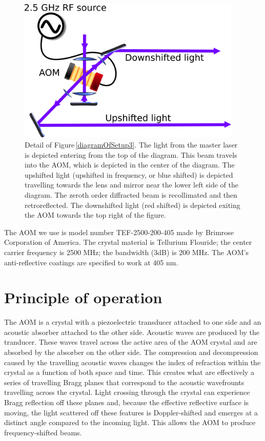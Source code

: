 \begin{figure}
\centerline{
\includegraphics[width=0.95\textwidth]{diagramOfAOM}}
\caption[AOM diagram]{\label{aomDiagramDetail} Detail of Figure\,\ref{diagramOfSetup3}. The light from the master laser is depicted entering from the top of the diagram. This beam travels into the AOM, which is depicted in the center of the diagram. The upshifted light (upshifted in frequency, or blue shifted) is depicted travelling towards the lens and mirror near the lower left side of the diagram. The zeroth order diffracted beam is recollimated and then retroreflected. The downshifted light (red shifted) is depicted exiting the AOM towards the top right of the figure.}
\end{figure}

The AOM we use is model number TEF-2500-200-405 made by Brimrose Corporation of America. The crystal material is Tellurium Flouride; the center carrier frequency is 2500 MHz; the bandwidth (3dB) is 200 MHz. The AOM's anti-reflective coatings are specified to work at 405 nm. 
\section{Principle of operation}

The AOM is a crystal with a piezoelectric transducer attached to one side and an acoustic absorber attached to the other side. Acoustic waves are produced by the tranducer. These waves travel across the active area of the AOM crystal and are absorbed by the absorber on the other side. The compression and decompression caused by the travelling acoustic waves changes the index of refraction within the crystal as a function of both space and time. This creates what are effectively a series of travelling Bragg planes that correspond to the acoustic wavefrounts travelling across the crystal. Light crossing through the crystal can experience Bragg reflection off these planes and, because the effective reflective surface is moving, the light scattered off these features is Doppler-shifted and emerges at a distinct angle compared to the incoming light. This allows the AOM to produce frequency-shifted beams. 

